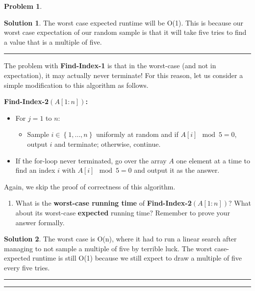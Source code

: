\documentclass{article}
\theoremstyle{definition}
\newtheorem{problem}{Problem}
\def\fline{\rule{0.75\linewidth}{0.5pt}}
\newcommand{\finishline}{
  \begin{center}\fline
\end{center}}
\newtheorem*{solution*}{Solution}
\newenvironment{solution}{
\begin{solution*}}{{\finishline}
\end{solution*}}
\newcommand{\set}[1]{\ensuremath{\left\{ #1 \right\}}}
\begin{document}
\begin{problem}
\begin{solution}
  The worst case expected runtime will be O(1). This is because our worst case expectation of our random sample is that it will take five tries to find a value that is a multiple of five.
\end{solution}

The problem with \textbf{Find-Index-1} is that in the worst-case (and not in expectation), it may actually never terminate! For this reason, let us consider
a simple modification to  this algorithm as follows.

\textbf{Find-Index-2$(A[1:n])$:}
\begin{itemize}
  \item For $j=1$ to $n$:
    \begin{itemize}
      \item Sample $i \in \set{1,\ldots,n}$ uniformly at random and if $A[i] \mod 5 = 0$, output $i$ and terminate; otherwise, continue.
    \end{itemize}
  \item If the for-loop never terminated, go over the array $A$ one element at a time to find an index $i$ with $A[i] \mod 5 =0$ and output it as the answer.
\end{itemize}

Again, we skip the proof of correctness of this algorithm.

\begin{enumerate}
  \item[(d)] What is the \textbf{worst-case running time} of \textbf{Find-Index-2$(A[1:n])$}? What about its worst-case \textbf{expected} running time? Remember to prove your answer formally.

\end{enumerate}

\end{problem}

\begin{solution}
The worst case is O(n), where it had to run a linear search after managing to not sample a multiple of five by terrible luck. The worst case-expected runtime is still O(1) because we still expect to draw a multiple of five every five tries.
\end{solution}

\newpage

\finishline
\end{document}
